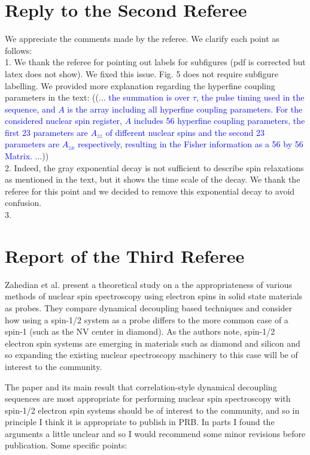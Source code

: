 \documentclass[12pt]{amsart}
\begin{document}
	\color{black} \section*{Reply to the Second Referee}
	We appreciate the comments made by the referee. We clarify each point as follows:\\
	1. We thank the referee for pointing out labels for subfigures (pdf is corrected but latex does not show). We fixed this issue. Fig. 5 does not require subfigure labelling. We provided more explanation regarding the hyperfine coupling parameters in the text:
	((... \textcolor{blue}{the summation is over $\tau$, the pulse timing used in the sequence, and $A$ is the array including all hyperfine coupling parameters. For the considered nuclear spin register, $A$ includes 56 hyperfine coupling parameters, the first 23 parameters are $A_{zz}$ of different nuclear spins and the second 23 parameters are $A_{zx}$ respectively, resulting in the Fisher information as a 56 by 56 Matrix.} ...)) \\   
	
	2. Indeed, the gray exponential decay is not sufficient to describe spin relaxations as mentioned in the text, but it shows the time scale of the decay. We thank the referee for this point and we decided to remove this exponential decay to avoid confusion.\\
	
	3.
	

	\color{red} \section{Report of the Third Referee}
	Zahedian et al. present a theoretical study on a the appropriateness of
	various methods of nuclear spin spectroscopy using electron spins in
	solid state materials as probes. They compare dynamical decoupling
	based techniques and consider how using a spin-1/2 system as a probe
	differs to the more common case of a spin-1 (such as the NV center in
	diamond). As the authors note, spin-1/2 electron spin systems are
	emerging in materials such as diamond and silicon and so expanding the
	existing nuclear spectroscopy machinery to this case will be of
	interest to the community.
	
	The paper and its main result that correlation-style dynamical
	decoupling sequences are most appropriate for performing nuclear spin
	spectroscopy with spin-1/2 electron spin systems should be of interest
	to the community, and so in principle I think it is appropriate to
	publish in PRB. In parts I found the arguments a little unclear and so
	I would recommend some minor revisions before publication. Some
	specific points:
	
\end{document}
